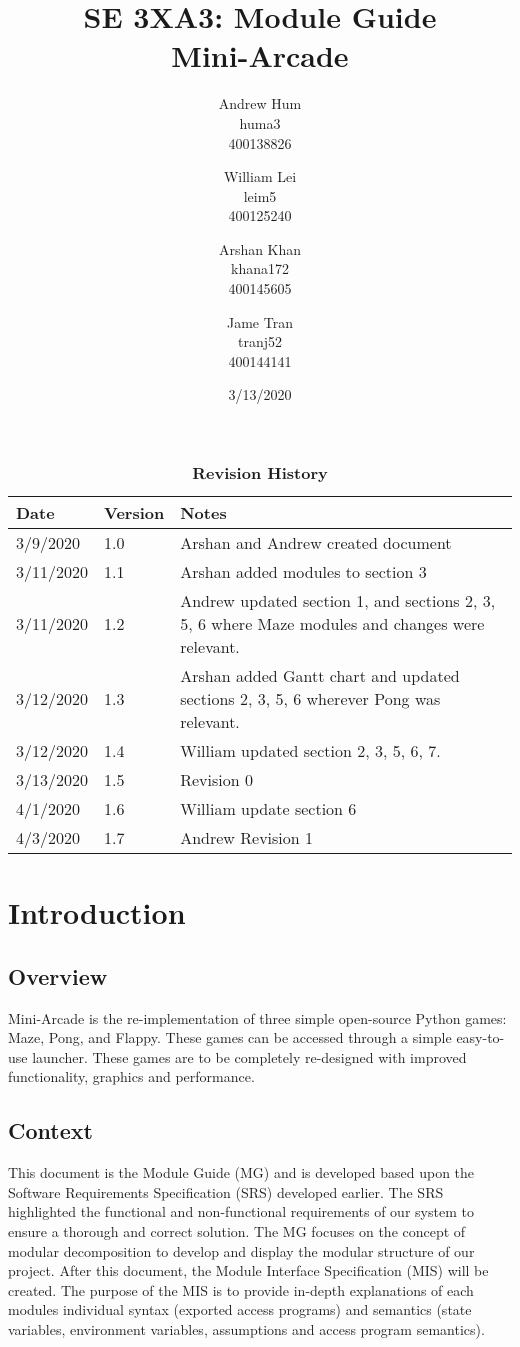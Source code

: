 \documentclass[12pt, titlepage]{article}
\title{SE 3XA3: Module Guide\\Mini-Arcade}
\author{Andrew Hum \\ huma3 \\ 400138826 \and
		William Lei \\ leim5 \\ 400125240 \and
		Arshan Khan \\ khana172 \\ 400145605 \and
		Jame Tran \\ tranj52 \\ 400144141
}
\date{3/13/2020}
\begin{document}
\maketitle

\tableofcontents
\newpage
\listoftables
\listoffigures

\begin{table}[bp]
\caption{\bf Revision History}
\begin{tabularx}{\textwidth}{p{3cm}p{2cm}X}
\toprule {\bf Date} & {\bf Version} & {\bf Notes}\\
\midrule
3/9/2020 & 1.0 & Arshan and Andrew created document\\
3/11/2020 & 1.1 & Arshan added modules to section 3\\
3/11/2020 & 1.2 & Andrew updated section 1, and sections 2, 3, 5, 6 where Maze modules and changes were relevant.\\
3/12/2020 & 1.3 & Arshan added Gantt chart and updated sections 2, 3, 5, 6 wherever Pong was relevant.\\
3/12/2020 & 1.4 & William updated section 2, 3, 5, 6, 7.\\
3/13/2020 & 1.5 & Revision 0\\
4/1/2020 & 1.6 & William update section 6 \\
4/3/2020 & 1.7 & Andrew Revision 1 \\
\bottomrule
\end{tabularx}
\end{table}

\newpage


\section{Introduction}
\subsection{Overview}
Mini-Arcade is the re-implementation of three simple open-source Python games: Maze, Pong, and Flappy. These games can be accessed through a simple easy-to-use launcher. These games are to be completely re-designed with improved functionality, graphics and performance.
\subsection{Context}
This document is the Module Guide (MG) and is developed based upon the Software Requirements Specification (SRS) developed earlier. The SRS highlighted the functional and non-functional requirements of our system to ensure a thorough and correct solution. The MG focuses on the concept of modular decomposition to develop and display the modular structure of our project. After this document, the Module Interface Specification (MIS) will be created. The purpose of the MIS is to provide in-depth explanations of each modules individual syntax (exported access programs) and semantics (state variables, environment variables, assumptions and access program semantics).
\end{document}
